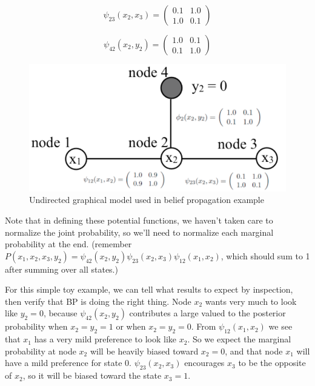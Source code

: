 \begin{equation}
\psi_{23}(x_2, x_3) = 
\left( 
\begin{array}{cc}
0.1 & 1.0 \\
1.0 & 0.1 
\end{array}
\right)
\end{equation}

\begin{equation}
\psi_{42}(x_2, y_2) = 
\left( 
\begin{array}{cc}
1.0 & 0.1 \\
0.1 & 1.0 
\end{array}
\right)
\end{equation}

\begin{figure}
\centerline{\includegraphics[width=0.48\linewidth]{figures/graphical_models/numerical.pdf}} 
\caption{Undirected graphical model used in belief propagation example} 
\label{fig:numerical}
\end{figure}
Note that in defining these potential functions, we haven't taken care to normalize the joint probability, so
we'll need to normalize each marginal probability at the end.
(remember $P(x_1,
x_2, x_3, y_2) = \psi_{42}(x_2, y_2) \psi_{23}(x_2, x_3) \psi_{12}(x_1,
x_2)$, which should sum to 1 after summing over all states.)


For this simple toy example, we can tell what results to expect by inspection, then verify that BP is doing the right thing.  Node $x_2$ wants very much to look like $y_2=0$, because
$\psi_{42}(x_2, y_2)$ contributes a large valued to the posterior
probability when $x_2 = y_2 = 1$ or when $x_2 = y_2 = 0$.  From
$\psi_{12}(x_1, x_2) $ we see that
$x_1$ has a very mild preference to
look like $x_2$.  So we expect the marginal probability at node $x_2$
will be heavily biased toward $x_2=0$, and that node $x_1$ will have a
mild preference for state 0.  $\psi_{23}(x_2, x_3)$ encourages 
$x_3$ to be the opposite of $x_2$, so it will be biased toward the state $x_3=1$.

